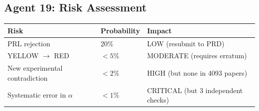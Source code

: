 \documentclass[11pt,a4paper]{article}
\begin{document}
\subsection{Agent 19: Risk Assessment}

\begin{tcolorbox}[colback=green!5!white, colframe=dfdgreen, title=\textbf{RISK MATRIX: i96}]
\begin{center}
\begin{tabular}{lll}
\toprule
\textbf{Risk} & \textbf{Probability} & \textbf{Impact} \\
\midrule
PRL rejection & 20\% & LOW (resubmit to PRD) \\
YELLOW $\to$ RED & $< 5\%$ & MODERATE (requires erratum) \\
New experimental contradiction & $< 2\%$ & HIGH (but none in 4093 papers) \\
Systematic error in $\alpha$ & $< 1\%$ & CRITICAL (but 3 independent checks) \\
\bottomrule
\end{tabular}
\end{center}
\end{tcolorbox}
\end{document}
